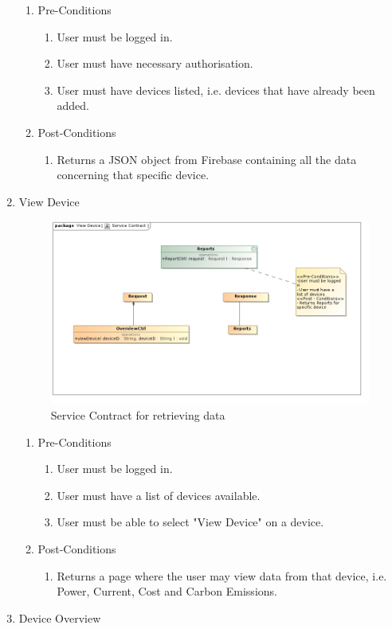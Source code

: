 \documentclass{article}
\begin{document}
\begin{enumerate}
		\begin{enumerate}
			\item  Pre-Conditions
			\begin{enumerate}
				\item	User must be logged in.
				\item	User must have necessary authorisation.
				\item	User must have devices listed, i.e. devices that have already been added.
			\end{enumerate}
			\item  Post-Conditions		
			\begin{enumerate}
				\item	Returns a JSON object from Firebase containing all the data concerning that specific device.
			\end{enumerate}
		\end{enumerate}
		\item	View Device
		
		\begin{figure}[H]
			\includegraphics[width=\textwidth]{images/ReportsServiceContract.jpg}
			\caption{Service Contract for retrieving data \label{overflow}}
		\end{figure}
		
		\begin{enumerate}
			\item  Pre-Conditions
			\begin{enumerate}
				\item	User must be logged in.
				\item	User must have a list of devices available.
				\item	User must be able to select "View Device" on a device.
			\end{enumerate}
			\item  Post-Conditions		
			\begin{enumerate}
				\item	Returns a page where the user may view data from that device, i.e. Power, Current, Cost and Carbon 
				Emissions.
			\end{enumerate}
		\end{enumerate}
		\item	Device Overview
		

\end{enumerate}
\end{document}
